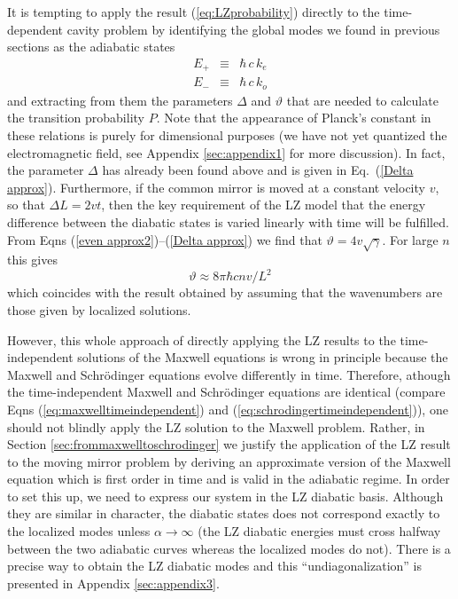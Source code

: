\documentclass[twocolumn,english,pra,aps,superscriptaddress,floatfix]{revtex4-1}
\begin{document}
It is tempting to apply the result (\ref{eq:LZprobability}) directly to the time-dependent cavity problem by identifying the global modes we found in previous sections as the adiabatic states
\begin{eqnarray}
E_{+} & \equiv & \hbar \, c \, k_{e} \label{eq:E+=keven} \\
E_{-} & \equiv & \hbar \, c \, k_{o}  \label{eq:E-=kodd}
\end{eqnarray}
and extracting from them the parameters $\Delta$ and $\vartheta$ that are needed to calculate the transition probability $P$. Note that the appearance of Planck's constant in these relations is purely for dimensional purposes (we have not yet quantized the electromagnetic field, see Appendix \ref{sec:appendix1} for more discussion).
In fact, the parameter $\Delta$ has already been found above and is given in Eq.\ (\ref{Delta approx}).
Furthermore, if the common mirror is moved at a constant velocity $v$, so that $\Delta L = 2 vt$, then the key requirement of the LZ model that the energy difference between the diabatic states is varied linearly with time will be fulfilled.  From Eqns (\ref{even approx2})--(\ref{Delta approx}) we find that $\vartheta= 4 v \sqrt{\gamma}$. For large $n$ this gives
\begin{equation}
\vartheta \approx 8 \pi \hbar c n  v/L^2 
\label{eq:thetaapprox}
\end{equation}
which coincides with the result obtained by assuming that the wavenumbers are those given by localized solutions.



However, this whole approach  of directly applying the LZ results to the time-independent solutions of the Maxwell equations is wrong in principle because the Maxwell and Schr\"{o}dinger equations evolve differently in time. Therefore, athough the time-independent Maxwell and Schr\"{o}dinger equations are identical (compare Eqns (\ref{eq:maxwelltimeindependent}) and (\ref{eq:schrodingertimeindependent})), one should not blindly apply the LZ solution to the Maxwell problem. Rather, in Section \ref{sec:frommaxwelltoschrodinger} we justify the application of the LZ result to the moving mirror problem by deriving an approximate version of the Maxwell equation which is first order in time and is
valid in the adiabatic regime. In order to set this up, we need to express our system in the LZ diabatic basis. Although they are similar in character, the diabatic states does not correspond exactly to the localized modes unless $\alpha \rightarrow \infty$ (the LZ diabatic energies must cross halfway between the two adiabatic curves whereas the localized modes do not). There is a precise way to obtain the LZ diabatic modes and this ``undiagonalization'' is presented in Appendix \ref{sec:appendix3}. 
\end{document}
